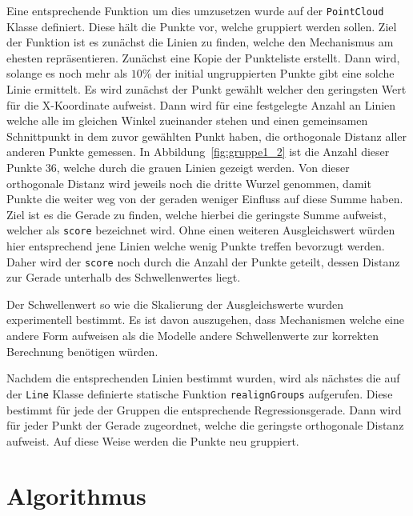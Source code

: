 Eine entsprechende Funktion um dies umzusetzen wurde auf der \lstinline{PointCloud} Klasse definiert.
Diese hält die Punkte vor, welche gruppiert werden sollen.
Ziel der Funktion ist es zunächst die Linien zu finden, welche den Mechanismus am ehesten repräsentieren.
Zunächst eine Kopie der Punkteliste erstellt.
Dann wird, solange es noch mehr als $10\%$ der initial ungruppierten Punkte gibt eine solche Linie ermittelt.
Es wird zunächst der Punkt gewählt welcher den geringsten Wert für die X-Koordinate aufweist.
Dann wird für eine festgelegte Anzahl an Linien welche alle im gleichen Winkel zueinander stehen und einen gemeinsamen Schnittpunkt in dem zuvor gewählten Punkt haben, die orthogonale Distanz aller anderen Punkte gemessen.
In Abbildung~\ref{fig:gruppe1_2} ist die Anzahl dieser Punkte 36, welche durch die grauen Linien gezeigt werden.
Von dieser orthogonale Distanz wird jeweils noch die dritte Wurzel genommen, damit Punkte die weiter weg von der geraden weniger Einfluss auf diese Summe haben.
Ziel ist es die Gerade zu finden, welche hierbei die geringste Summe aufweist, welcher als \lstinline{score} bezeichnet wird.
Ohne einen weiteren Ausgleichswert würden hier entsprechend jene Linien welche wenig Punkte treffen bevorzugt werden.
Daher wird der \lstinline{score} noch durch die Anzahl der Punkte geteilt, dessen Distanz zur Gerade unterhalb des Schwellenwertes liegt.

Der Schwellenwert so wie die Skalierung der Ausgleichswerte wurden experimentell bestimmt.
Es ist davon auszugehen, dass Mechanismen welche eine andere Form aufweisen als die  Modelle andere Schwellenwerte zur korrekten Berechnung benötigen würden.

Nachdem die entsprechenden Linien bestimmt wurden, wird als nächstes die auf der \lstinline{Line} Klasse definierte statische Funktion \lstinline{realignGroups} aufgerufen.
Diese bestimmt für jede der Gruppen die entsprechende Regressionsgerade.
Dann wird für jeder Punkt der Gerade zugeordnet, welche die geringste orthogonale Distanz aufweist.
Auf diese Weise werden die Punkte neu gruppiert.

\section{ Algorithmus}\label{ch:kMeans}

